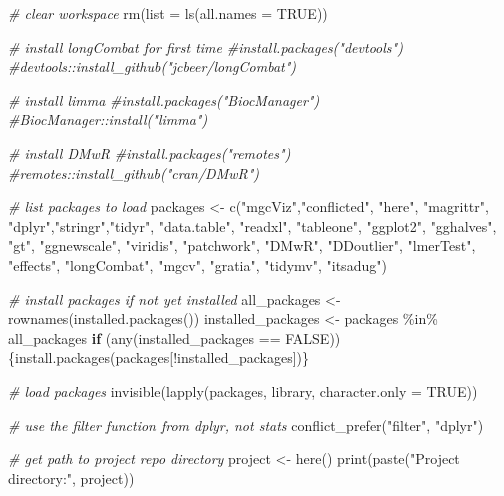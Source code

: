 \documentclass[
]{article}
\newenvironment{Shaded}{\begin{snugshade}}{\end{snugshade}}
\newcommand{\AttributeTok}[1]{\textcolor[rgb]{0.77,0.63,0.00}{#1}}
\newcommand{\CommentTok}[1]{\textcolor[rgb]{0.56,0.35,0.01}{\textit{#1}}}
\newcommand{\ConstantTok}[1]{\textcolor[rgb]{0.00,0.00,0.00}{#1}}
\newcommand{\ControlFlowTok}[1]{\textcolor[rgb]{0.13,0.29,0.53}{\textbf{#1}}}
\newcommand{\FunctionTok}[1]{\textcolor[rgb]{0.00,0.00,0.00}{#1}}
\newcommand{\NormalTok}[1]{#1}
\newcommand{\OtherTok}[1]{\textcolor[rgb]{0.56,0.35,0.01}{#1}}
\newcommand{\SpecialCharTok}[1]{\textcolor[rgb]{0.00,0.00,0.00}{#1}}
\newcommand{\StringTok}[1]{\textcolor[rgb]{0.31,0.60,0.02}{#1}}
\begin{document}
\begin{Shaded}
\begin{Highlighting}[]
\CommentTok{\# clear workspace}
\FunctionTok{rm}\NormalTok{(}\AttributeTok{list =} \FunctionTok{ls}\NormalTok{(}\AttributeTok{all.names =} \ConstantTok{TRUE}\NormalTok{))}

\CommentTok{\# install longCombat for first time}
\CommentTok{\#install.packages("devtools")}
\CommentTok{\#devtools::install\_github("jcbeer/longCombat")}

\CommentTok{\# install limma}
\CommentTok{\#install.packages("BiocManager")}
\CommentTok{\#BiocManager::install("limma")}

\CommentTok{\# install DMwR}
\CommentTok{\#install.packages("remotes")}
\CommentTok{\#remotes::install\_github("cran/DMwR")}

\CommentTok{\# list packages to load}
\NormalTok{packages }\OtherTok{\textless{}{-}} \FunctionTok{c}\NormalTok{(}\StringTok{"mgcViz"}\NormalTok{,}\StringTok{"conflicted"}\NormalTok{, }\StringTok{"here"}\NormalTok{, }\StringTok{"magrittr"}\NormalTok{, }\StringTok{"dplyr"}\NormalTok{,}\StringTok{"stringr"}\NormalTok{,}\StringTok{"tidyr"}\NormalTok{, }\StringTok{"data.table"}\NormalTok{, }\StringTok{"readxl"}\NormalTok{, }\StringTok{"tableone"}\NormalTok{, }\StringTok{"ggplot2"}\NormalTok{, }\StringTok{"gghalves"}\NormalTok{, }\StringTok{"gt"}\NormalTok{, }\StringTok{"ggnewscale"}\NormalTok{, }\StringTok{"viridis"}\NormalTok{, }\StringTok{"patchwork"}\NormalTok{, }\StringTok{"DMwR"}\NormalTok{, }\StringTok{"DDoutlier"}\NormalTok{, }\StringTok{"lmerTest"}\NormalTok{, }\StringTok{"effects"}\NormalTok{, }\StringTok{"longCombat"}\NormalTok{, }\StringTok{"mgcv"}\NormalTok{, }\StringTok{"gratia"}\NormalTok{, }\StringTok{"tidymv"}\NormalTok{, }\StringTok{"itsadug"}\NormalTok{)}

\CommentTok{\# install packages if not yet installed}
\NormalTok{all\_packages }\OtherTok{\textless{}{-}} \FunctionTok{rownames}\NormalTok{(}\FunctionTok{installed.packages}\NormalTok{())}
\NormalTok{installed\_packages }\OtherTok{\textless{}{-}}\NormalTok{ packages }\SpecialCharTok{\%in\%}\NormalTok{ all\_packages}
\ControlFlowTok{if}\NormalTok{ (}\FunctionTok{any}\NormalTok{(installed\_packages }\SpecialCharTok{==} \ConstantTok{FALSE}\NormalTok{))\{}\FunctionTok{install.packages}\NormalTok{(packages[}\SpecialCharTok{!}\NormalTok{installed\_packages])\}}

\CommentTok{\# load packages}
\FunctionTok{invisible}\NormalTok{(}\FunctionTok{lapply}\NormalTok{(packages, library, }\AttributeTok{character.only =} \ConstantTok{TRUE}\NormalTok{))}

\CommentTok{\# use the filter function from dplyr, not stats}
\FunctionTok{conflict\_prefer}\NormalTok{(}\StringTok{"filter"}\NormalTok{, }\StringTok{"dplyr"}\NormalTok{)}

\CommentTok{\# get path to project repo directory}
\NormalTok{project }\OtherTok{\textless{}{-}} \FunctionTok{here}\NormalTok{()}
\FunctionTok{print}\NormalTok{(}\FunctionTok{paste}\NormalTok{(}\StringTok{"Project directory:"}\NormalTok{, project))}
\end{Highlighting}
\end{Shaded}
\end{document}
